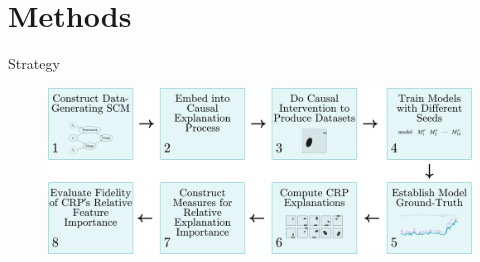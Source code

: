 \documentclass[German, aspectratio=169]{beamer}
\begin{document}
\section
 [Methods]{Methods}
\begin{frame}{Strategy} %
    \begin{figure}
        \centering
        \includegraphics[width=\textwidth]{images/strategy1.png}
    \end{figure}
\end{frame}
\end{document}
